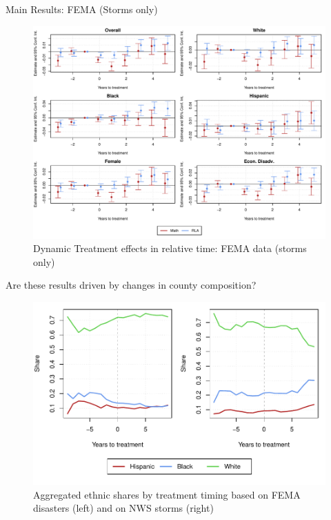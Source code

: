 \documentclass[hyperref={colorlinks = true,linkcolor = blue, citecolor=blue,urlcolor=blue}]{beamer}
\begin{document}
\begin{frame}{Main Results: FEMA (Storms only)}
	\begin{figure}[!h]
		\centering
		\includegraphics[scale=0.45]{"../Code & Data/ResultsPlotFEMAStormPresentation.pdf"}
		\caption{Dynamic Treatment effects in relative time: FEMA data (storms only)}
	\end{figure}
\end{frame}


\begin{frame}{Are these results driven by changes in county composition?}
	\begin{figure}[!h]
		\centering
		\includegraphics[scale=0.6]{"../Code & Data/EthnicComposition.pdf"}
		\caption{Aggregated ethnic shares by treatment timing based on FEMA disasters (left) and on NWS storms (right)}
		\label{EthnicComposition}
	\end{figure}
\end{frame}
\end{document}
